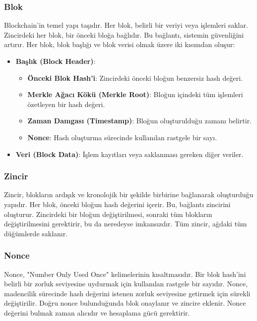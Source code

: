 \subsubsection{Blok}

Blockchain'in temel yapı taşıdır. Her blok, belirli bir veriyi veya işlemleri saklar. Zincirdeki her blok, bir önceki bloğa bağlıdır. Bu bağlantı, sistemin güvenliğini artırır. Her blok, blok başlığı ve blok verisi olmak üzere iki kısımdan oluşur:

\begin{itemize}
    \item \textbf{Başlık (Block Header)}:
    \begin{itemize}
        \item \textbf{Önceki Blok Hash'i}: Zincirdeki önceki bloğun benzersiz hash değeri.
        \item \textbf{Merkle Ağacı Kökü (Merkle Root)}: Bloğun içindeki tüm işlemleri özetleyen bir hash değeri.
        \item \textbf{Zaman Damgası (Timestamp)}: Bloğun oluşturulduğu zamanı belirtir.
        \item \textbf{Nonce}: Hash oluşturma sürecinde kullanılan rastgele bir sayı.
    \end{itemize}
    \item \textbf{Veri (Block Data)}: İşlem kayıtları veya saklanması gereken diğer veriler.
\end{itemize}

\subsubsection{Zincir}

Zincir, blokların ardışık ve kronolojik bir şekilde birbirine bağlanarak oluşturduğu yapıdır. Her blok, önceki bloğun hash değerini içerir. Bu, bağlantı zincirini oluşturur. Zincirdeki bir bloğun değiştirilmesi, sonraki tüm blokların değiştirilmesini gerektirir, bu da neredeyse imkansızdır. Tüm zincir, ağdaki tüm düğümlerde saklanır.

\subsubsection{Nonce}

Nonce, "Number Only Used Once" kelimelerinin kısaltmasıdır. Bir blok hash'ini belirli bir zorluk seviyesine uydurmak için kullanılan rastgele bir sayıdır. Nonce, madencilik sürecinde hash değerini istenen zorluk seviyesine getirmek için sürekli değiştirilir. Doğru nonce bulunduğunda blok onaylanır ve zincire eklenir. Nonce değerini bulmak zaman alıcıdır ve hesaplama gücü gerektirir. 


